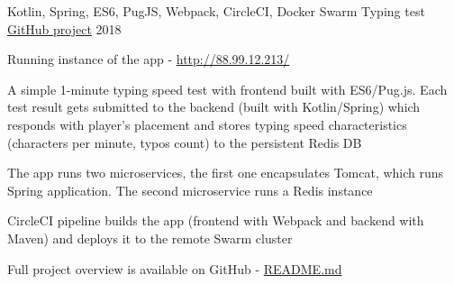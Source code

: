 \begin{cventries}
  \cventry
    {Kotlin, Spring, ES6, PugJS, Webpack, CircleCI, Docker Swarm}
    {Typing test}
    {\color{awesome-skyblue}\href{https://github.com/zhukovsd/typing-test}{\underline{GitHub project}}}
    {2018}
    {
      \begin{cvitems} %
        \item {Running instance of the app - {\color{awesome-skyblue}\href{http://88.99.12.213/}{http://88.99.12.213/}}}
        \item {A simple 1-minute typing speed test with frontend built with ES6/Pug.js. Each test result gets submitted to the backend (built with Kotlin/Spring) which responds with player's placement and stores typing speed characteristics (characters per minute, typos count) to the persistent Redis DB}
        \item {The app runs two microservices, the first one encapsulates Tomcat, which runs Spring application. The second microservice runs a Redis instance}
        \item {CircleCI pipeline builds the app (frontend with Webpack and backend with Maven) and deploys it to the remote Swarm cluster}
        \item Full project overview is available on GitHub - {\color{awesome-skyblue}\href{https://github.com/zhukovsd/typing-test/blob/master/README.md}{README.md}}
      \end{cvitems}
    }    
    
\end{cventries}
